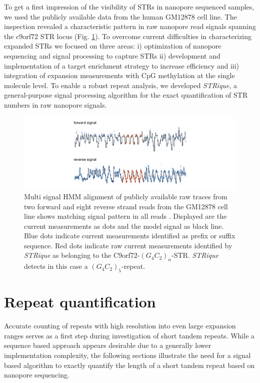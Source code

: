 To get a first impression of the visibility of STRs in nanopore sequenced samples, we used the publicly available data from the human GM12878 cell line. The inspection revealed a characteristic pattern in raw nanopore read signals spanning the c9orf72 STR locus (Fig. \ref{fig:strique:signal}). 
To overcome current difficulties in characterizing expanded STRs we focused on three areas: i) optimization of nanopore sequencing and signal processing to capture STRs ii) development and implementation of a target enrichment strategy to increase efficiency and iii) integration of expansion measurements with CpG methylation at the single molecule level.
To enable a robust repeat analysis, we developed \textit{STRique}, a general-purpose signal processing algorithm for the exact quantification of STR numbers in raw nanopore signals.

\begin{figure}[h]
	\centering
	\includegraphics[width=1.0\textwidth]{figures/strique/signal.pdf}
	\captionsetup{format=plain}
	\caption[Nanopore raw signal of the C9orf72 STR in GM12878 cells]{Multi signal HMM alignment of publicly available raw traces from two forward and eight reverse strand reads from the GM12878 cell line shows matching signal pattern in all reads \cite{Jain2018}. Displayed are the current measurements as dots and the model signal as black line. Blue dots indicate current measurements identified as prefix or suffix sequence. Red dots indicate raw current measurements identified by \textit{STRique} as belonging to the C9orf72-$ (G_{4}C_{2})_{n} $-STR. \textit{STRique} detects in this case a $ (G_{4}C_{2})_{5} $-repeat.}
	\label{fig:strique:signal}
\end{figure}




\section{Repeat quantification}
\label{sec:strique:quantification}

Accurate counting of repeats with high resolution into even large expansion ranges serves as a first step during investigation of short tandem repeats. While a sequence based approach appears desirable due to a generally lower implementation complexity, the following sections illustrate the need for a signal based algorithm to exactly quantify the length of a short tandem repeat based on nanopore sequencing.

